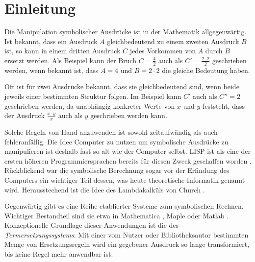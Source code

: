 

\chapter{Einleitung} \label{secEinleitung}

Die Manipulation symbolischer Ausdrücke ist in der Mathematik allgegenwärtig. Ist bekannt, dass ein Ausdruck $A$ gleichbedeutend zu einem zweiten Ausdruck $B$ ist, so kann in einem dritten Ausdruck $C$ jedes Vorkommen von $A$ durch $B$ ersetzt werden. Als Beispiel kann der Bruch $C = \frac{4}{2}$ auch als $C' = \frac{2 \cdot 2}{2}$ geschrieben werden, wenn bekannt ist, dass $A = 4$ und $B = 2 \cdot 2$ die gleiche Bedeutung haben. 

Oft ist für zwei Ausdrücke bekannt, dass sie gleichbedeutend sind, wenn beide jeweils einer bestimmten Struktur folgen. Im Beispiel kann $C'$ auch als $C'' = 2$ geschrieben werden, da unabhängig konkreter Werte von $x$ und $y$ feststeht, dass der Ausdruck $\frac{x \cdot y}{x}$ auch als $y$ geschrieben werden kann.

Solche Regeln von Hand anzuwenden ist sowohl zeitaufwändig als auch fehleranfällig. 
Die Idee Computer zu nutzen um symbolische Ausdrücke zu manipulieren ist deshalb fast so alt wie der Computer selbst.  LISP ist als eine der ersten höheren Programmiersprachen bereits für diesen Zweck geschaffen worden \cite{lisp}. Rückblickend war die symbolische Berechnung sogar vor der Erfindung des Computers ein wichtiger Teil dessen, was heute theoretische Informatik genannt wird. Herausstechend ist die Idee des Lambdakalküls von Church \cite{ChurchLambda36}. 

Gegenwärtig gibt es eine Reihe etablierter Systeme zum symbolischen Rechnen. Wichtiger Bestandteil sind sie etwa in Mathematica \cite{MathematicaSymbolic}, Maple \cite{MapleSymbolic} oder Matlab \cite{MatlabSymbolic}.
Konzeptionelle Grundlage dieser Anwendungen ist die des \emph{Termersetzungssystems}: Mit einer vom Nutzer oder Bibliotheksautor bestimmten Menge von Ersetzungsregeln wird ein gegebener Ausdruck so lange transformiert, bis keine Regel mehr anwendbar ist.



